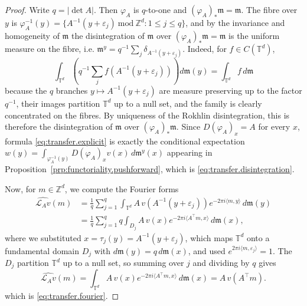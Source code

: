 \documentclass[11pt,reqno]{amsart}
\theoremstyle{plain}
\theoremstyle{definition}
\newcommand{\T}{\mathbb{T}}
\newcommand{\Z}{\mathbb{Z}}
\newcommand{\Leb}{\mathfrak{m}}
\newcommand{\Transf}{\mathcal{L}}
\begin{document}
\begin{proof}
    Write \(q = \lvert \det A \rvert\).
    Then \(  \varphi_A  \) is \( q\)-to-one and \( ( \varphi_A )_\ast \Leb=\Leb \).
    The fibre over \( y \) is \( \varphi_A ^{-1}(y)=\{A^{-1}(y+\varepsilon_j)\ \mathrm{mod}\ \Z^d: 1\le j\le q\}\), and by the invariance and homogeneity of \( \Leb \) the disintegration of \( \Leb \) over \( ( \varphi_A )_\ast \Leb=\Leb \) is the uniform measure on the fibre, i.e. \(\Leb^y=q^{-1}\sum_{j}\delta_{A^{-1}(y+\varepsilon_j)}.\)
    Indeed, for \( f\in C(\T^d) \),
    \[
        \int_{\T^d}\left(q^{-1}\sum_jf(A^{-1}(y+\varepsilon_j))\right)d\Leb(y) =\int_{\T^d}f\,d\Leb
    \]
    because the \( q \) branches \( y\mapsto A^{-1}(y+\varepsilon_j) \) are measure preserving up to the factor \( q^{-1} \), their images partition \( \T^d \) up to a null set, and the family is clearly concentrated on the fibres.
    By uniqueness of the Rokhlin disintegration, this is therefore the disintegration of \( \Leb \) over \( ( \varphi_A )_\ast\Leb \).
    Since \( D( \varphi_A )_x=A \) for every \( x \), formula \eqref{eq:transfer.explicit} is exactly the conditional expectation \( w(y)=\int_{ \varphi_A ^{-1}(y)}D( \varphi_A )_xv(x)\,d\Leb^y(x) \) appearing in Proposition~\ref{prp:functoriality.pushforward}, which is \eqref{eq:transfer.disintegration}.

    Now, for \( m\in\Z^d \), we compute the Fourier forms
    \begin{align*}
        \widehat{\Transf_A v}(m)
         & =\frac1q\sum_{j=1}^q
        \int_{\T^d}
        A\,v\!\left(A^{-1}(y+\varepsilon_j)\right)
        e^{-2\pi i\langle m,y\rangle}\,d\Leb(y) \\
         & =\frac1q\sum_{j=1}^q
        q\int_{D_j}
        A\,v(x)e^{-2\pi i\langle A^{\top}m,x\rangle}\,d\Leb(x),
    \end{align*}
    where we substituted \(x=\tau_j(y)=A^{-1}(y+\varepsilon_j)\), which maps \(\T^d\) onto a fundamental domain \(D_j\) with \(d\Leb(y)=q\,d\Leb(x)\), and used \(e^{2\pi i\langle m,\varepsilon_j\rangle}=1\).
    The \(D_j\) partition \(\T^d\) up to a null set, so summing over \(j\) and dividing by \(q\) gives
    \[
        \widehat{\Transf_A v}(m)=\int_{\T^d} A\,v(x)e^{-2\pi i\langle A^{\top}m,x\rangle}\,d\Leb(x) = A\,\hat v(A^{\top}m).
    \]
    which is \eqref{eq:transfer.fourier}.


\end{proof}
\end{document}

